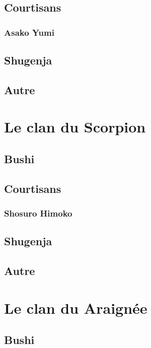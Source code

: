 \documentclass[10pt,a4paper]{book}
\begin{document}
\section{Courtisans}

\subsection{Asako Yumi}

\section{Shugenja}

\section{Autre}


\chapter{Le clan du Scorpion}

\section{Bushi}

\section{Courtisans}

\subsection{Shosuro Himoko}

\section{Shugenja}

\section{Autre}



\chapter{Le clan du Araignée}

\section{Bushi}
\end{document}
